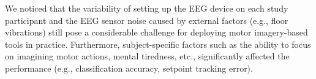 We noticed that the variability of setting up the \gls{EEG} device on each study participant and the \gls{EEG} sensor noise caused by external factors (e.g., floor vibrations) still pose a considerable challenge for deploying motor imagery-based tools in practice. Furthermore, subject-specific factors such as the ability to focus on imagining motor actions, mental tiredness, etc., significantly affected the performance (e.g., classification accuracy, setpoint tracking error).